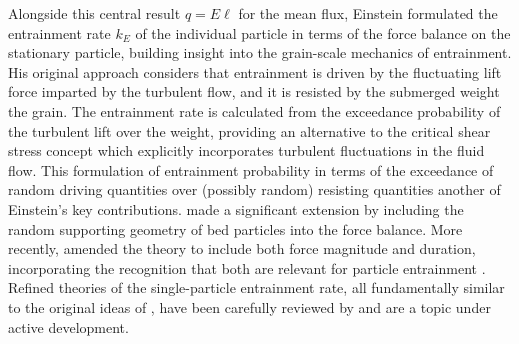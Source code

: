 Alongside this central result $q=E\ell$ for the mean flux, Einstein formulated the entrainment rate $k_E$ of the individual particle in terms of the force balance on the stationary particle, building insight into the grain-scale mechanics of entrainment.
His original approach considers that entrainment is driven by the fluctuating lift force imparted by the turbulent flow, and it is resisted by the submerged weight the grain.
The entrainment rate is calculated from the exceedance probability of the turbulent lift over the weight, providing an alternative to the critical shear stress concept which explicitly incorporates turbulent fluctuations in the fluid flow.
This formulation of entrainment probability in terms of the exceedance of random driving quantities over (possibly
random) resisting quantities \citep{Grass1970} another of Einstein's key contributions.
\citet{Paintal1971} made a significant extension
by including the random supporting geometry of bed particles into the force balance.
More recently, \citet{Tregnaghi2012}
amended the theory to include both force magnitude and duration, incorporating the recognition that both are relevant for particle entrainment \citep{Diplas2008, Valyrakis2013, Celik2014}.
Refined theories of the single-particle entrainment rate, all fundamentally similar to the original ideas of \citet{Einstein1950}, have been carefully reviewed by \citet{Dey2018} and are a topic under active development.

